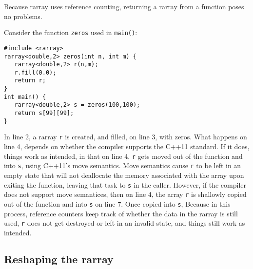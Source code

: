 \documentclass[11pt,twoside]{article}
\begin{document}
Because rarray uses reference counting, returning a rarray from a
function poses no problems.

Consider the function \texttt{zeros} used in \texttt{main()}:
\vspace{-9pt}
\begin{framed}\vspace{-12pt}%
\begin{verbatim}
#include <rarray>
rarray<double,2> zeros(int n, int m) {
   rarray<double,2> r(n,m);
   r.fill(0.0);
   return r;
}
int main() {
   rarray<double,2> s = zeros(100,100);
   return s[99][99];
}
\end{verbatim}%
\vspace{-12pt}
\end{framed}\vspace{-8pt}
In line 2, a rarray \texttt{r} is created, and filled, on line 3, with zeros.
What happens on line 4, depends on whether the compiler supports the
C++11 standard. If it does, things work as intended, in that on line 4, \texttt{r} gets moved out of
the function and into \texttt{s}, using C++11's move
semantics. Move semantics cause \texttt{r} to be left in an empty state
that will not deallocate the memory associated with the array upon
exiting the function, leaving that task to \texttt{s} in the caller. However, if the compiler does not support move semantices,
then on line 4, the array \texttt{r} is shallowly copied out of the
function and into \texttt{s} on line 7. Once copied into \texttt{s},
Because in this process, reference counters keep track of whether the
data in the rarray is still used, \texttt{r} does not get destroyed or
left in an invalid state, and things still work as intended.

\subsection{Reshaping the rarray}
\end{document}
